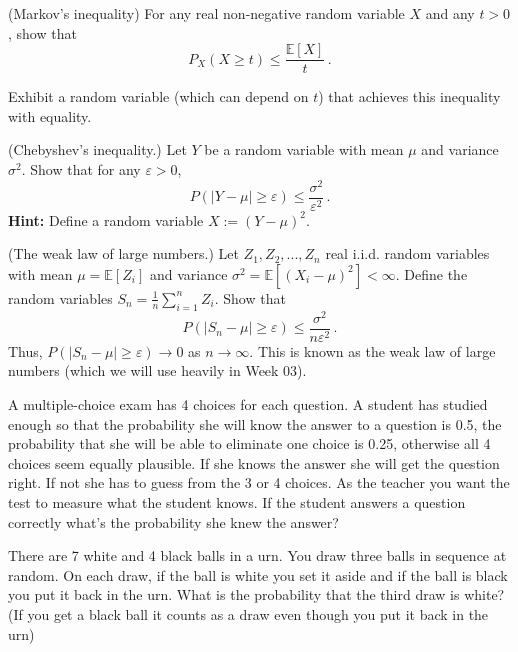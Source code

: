 \documentclass[a4paper,10pt,landscape,twocolumn]{scrartcl}
\begin{document}
\homeworkproblems

\begin{exercise}
	\begin{subex}[(2pt)] (Markov's inequality) For any real non-negative random variable $X$ and any $t > 0$, show that
	\[
	P_X(X \geq t) \leq \frac{\mathbb{E}[X]}{t}\, .
	\]
\end{subex}
\begin{subex}[(1pt)]
	Exhibit a random variable (which can depend on $t$) that achieves this inequality with equality.
	\end{subex}

	\begin{subex}[(3pt)] (Chebyshev's inequality.) Let $Y$ be a random variable with mean $\mu$ and variance $\sigma^2$. Show that for any $\varepsilon > 0$,
	\[
	P(|Y - \mu| \geq \varepsilon) \leq \frac{\sigma^2}{\varepsilon^2} \, .
	\]
	\textbf{Hint:} Define a random variable $X := (Y - \mu)^2$.
	\end{subex}
	\begin{subex}[(3pt)] (The weak law of large numbers.) Let $Z_1, Z_2, ..., Z_n$ real i.i.d. random variables with mean $\mu = \mathbb{E}[Z_i]$ and variance $\sigma^2 = \mathbb{E}[(X_i - \mu)^2] < \infty$. Define the random variables $S_n = \frac{1}{n} \sum_{i=1}^n Z_i$. Show that
	\[
	P(|S_n - \mu | \geq \varepsilon) \leq \frac{\sigma^2}{n\varepsilon^2}\, .
	\]
	Thus, $P(|S_n - \mu| \geq \varepsilon) \to 0$ as $n \to \infty$. This is known as the weak law of large numbers (which we will use heavily in Week 03).
	\end{subex}
\end{exercise}

\begin{exercise}
A multiple-choice exam has 4 choices for each question. A student has studied enough so that the probability she will know the answer to a question is 0.5, the probability that she will be able to eliminate one choice is 0.25, otherwise all 4 choices seem equally plausible. If she knows the answer she will get the question right. If not she has to guess from the 3 or 4 choices.
As the teacher you want the test to measure what the student knows. If the student answers a question correctly what’s the probability she knew the answer?
\end{exercise}

\begin{exercise}
There are 7 white and 4 black balls in a urn. You draw three balls in sequence at random. On each draw, if the ball is white you set it aside and if the ball is black you put it back in the urn. What is the probability that the third draw is white? (If you get a black ball it counts as a draw even though you put it back in the urn)
\end{exercise}
\end{document}
